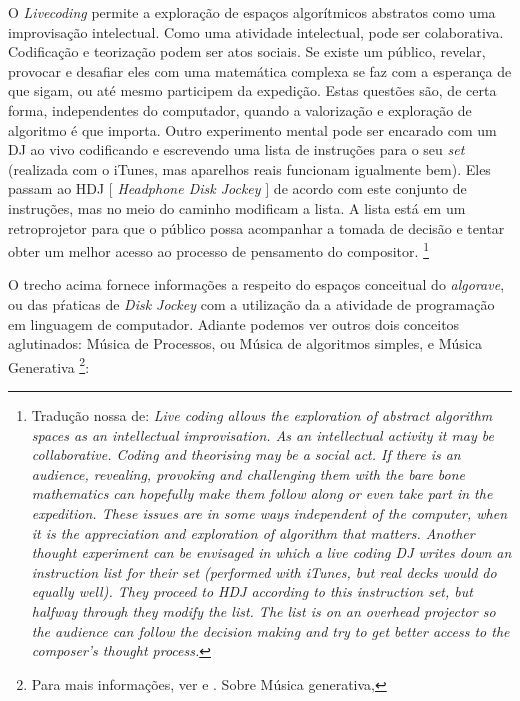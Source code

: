 \begin{citacao}
O \emph{Livecoding} permite a exploração de espaços algorítmicos abstratos como uma improvisação intelectual. Como uma atividade intelectual, pode ser colaborativa. Codificação e teorização podem ser atos sociais. Se existe um público, revelar, provocar e desafiar eles com uma matemática complexa se faz com a esperança de que sigam, ou até mesmo participem da expedição. Estas questões são, de certa forma, independentes do computador, quando a valorização e exploração de algoritmo é que importa. Outro experimento mental pode ser encarado com um DJ ao vivo codificando e escrevendo uma lista de instruções para o seu \emph{set} (realizada com o iTunes, mas aparelhos reais funcionam igualmente bem). Eles passam ao HDJ $[$ \emph{Headphone Disk Jockey} $]$ de acordo com este conjunto de instruções, mas no meio do caminho modificam a lista. A lista está em um retroprojetor para que o público possa acompanhar a tomada de decisão e tentar obter um melhor acesso ao processo de pensamento do compositor. \cite[p.~245]{ward_live_2004} \footnote{Tradução nossa de: \emph{Live coding allows the exploration of abstract algorithm spaces as an intellectual improvisation. As an intellectual activity it may be collaborative. Coding and theorising may be a social act. If there is an audience, revealing, provoking and challenging them with the bare bone mathematics can hopefully make them follow along or even take part in the expedition. These issues are in some ways independent of the computer, when it is the appreciation and exploration of algorithm that matters.   Another thought experiment can be envisaged in which a live coding DJ writes down an instruction list for their set (performed with iTunes, but real decks would do equally well). They proceed to HDJ according to this instruction set, but halfway through they modify the list. The list is on an overhead projector so the audience can follow the decision making and try to get better access to the composer’s thought process.}}
\end{citacao}

O trecho acima fornece informações a respeito do espaços conceitual do \emph{algorave}, ou das pŕaticas de \emph{Disk Jockey} com a utilização da a atividade de programação em linguagem de computador. Adiante podemos ver outros dois conceitos aglutinados: Música de Processos, ou Música de algoritmos simples, e Música Generativa \footnote{Para mais informações, ver  e . Sobre Música generativa,  }:

